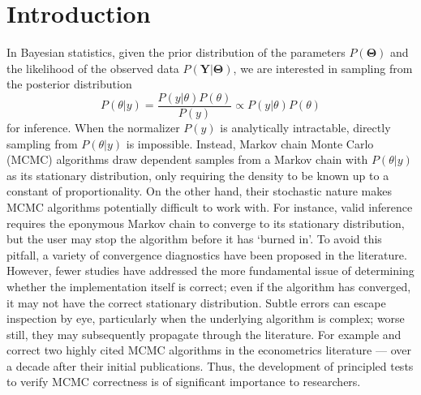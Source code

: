 \documentclass[a4paper,11pt]{article}
\begin{document}
\section{Introduction}
In Bayesian statistics, given the prior distribution of the parameters $P(\mathbf{\Theta})$ and the likelihood of the observed data $P(\mathbf{Y} | \mathbf{\Theta})$, we are interested in sampling from the posterior distribution
\begin{equation}
    P(\theta | y) = \frac{P(y | \theta)P(\theta)}{P(y)} \propto P(y | \theta)P(\theta)
    \label{eq:posterior}
\end{equation}
for inference. When the normalizer $P(y)$ is analytically intractable, directly sampling from $P(\theta | y)$ is impossible. Instead, Markov chain Monte Carlo (MCMC) algorithms draw dependent samples from a Markov chain with $P(\theta | y)$ as its stationary distribution, only requiring the density to be known up to a constant of proportionality. On the other hand, their stochastic nature makes MCMC algorithms potentially difficult to work with. For instance, valid inference requires the eponymous Markov chain to converge to its stationary distribution, but the user may stop the algorithm before it has `burned in'. To avoid this pitfall, a variety of convergence diagnostics have been proposed in the literature. However, fewer studies have addressed the more fundamental issue of determining whether the implementation itself is correct; even if the algorithm has converged, it may not have the correct stationary distribution. Subtle errors can escape inspection by eye, particularly when the underlying algorithm is complex; worse still, they may subsequently propagate through the literature. For example \cite{del_negro_time_2015} and \cite{karlsson_corrigendum_2017} correct two highly cited MCMC algorithms in the econometrics literature --- over a decade after their initial publications. Thus, the development of principled tests to verify MCMC correctness is of significant importance to researchers.
\end{document}

